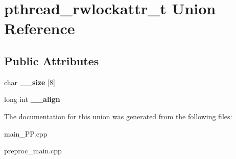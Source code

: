 \hypertarget{unionpthread__rwlockattr__t}{\section{pthread\+\_\+rwlockattr\+\_\+t Union Reference}
\label{unionpthread__rwlockattr__t}
}
\subsection*{Public Attributes}
\begin{DoxyCompactItemize}
\item 
\hypertarget{unionpthread__rwlockattr__t_a4b2f661513fe70c5971787f574ccb3dd}{char {\bfseries \+\_\+\+\_\+size} \mbox{[}8\mbox{]}}\label{unionpthread__rwlockattr__t_a4b2f661513fe70c5971787f574ccb3dd}

\item 
\hypertarget{unionpthread__rwlockattr__t_a3ff3b27c974ddac3709268ac675ce850}{long int {\bfseries \+\_\+\+\_\+align}}\label{unionpthread__rwlockattr__t_a3ff3b27c974ddac3709268ac675ce850}

\end{DoxyCompactItemize}


The documentation for this union was generated from the following files\+:\begin{DoxyCompactItemize}
\item 
main\+\_\+\+P\+P.\+cpp\item 
preproc\+\_\+main.\+cpp\end{DoxyCompactItemize}
